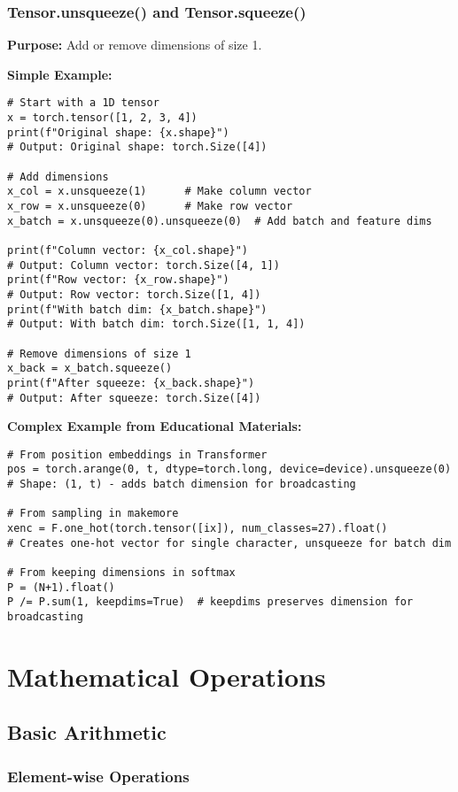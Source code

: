 \documentclass[11pt,a4paper]{book}
\begin{document}
\subsection{Tensor.unsqueeze() and Tensor.squeeze()}

\textbf{Purpose:} Add or remove dimensions of size 1.

\textbf{Simple Example:}
\begin{verbatim}
# Start with a 1D tensor
x = torch.tensor([1, 2, 3, 4])
print(f"Original shape: {x.shape}")
# Output: Original shape: torch.Size([4])

# Add dimensions
x_col = x.unsqueeze(1)      # Make column vector
x_row = x.unsqueeze(0)      # Make row vector
x_batch = x.unsqueeze(0).unsqueeze(0)  # Add batch and feature dims

print(f"Column vector: {x_col.shape}")
# Output: Column vector: torch.Size([4, 1])
print(f"Row vector: {x_row.shape}")
# Output: Row vector: torch.Size([1, 4])
print(f"With batch dim: {x_batch.shape}")
# Output: With batch dim: torch.Size([1, 1, 4])

# Remove dimensions of size 1
x_back = x_batch.squeeze()
print(f"After squeeze: {x_back.shape}")
# Output: After squeeze: torch.Size([4])
\end{verbatim}

\textbf{Complex Example from Educational Materials:}
\begin{verbatim}
# From position embeddings in Transformer
pos = torch.arange(0, t, dtype=torch.long, device=device).unsqueeze(0)
# Shape: (1, t) - adds batch dimension for broadcasting

# From sampling in makemore
xenc = F.one_hot(torch.tensor([ix]), num_classes=27).float()
# Creates one-hot vector for single character, unsqueeze for batch dim

# From keeping dimensions in softmax
P = (N+1).float()
P /= P.sum(1, keepdims=True)  # keepdims preserves dimension for broadcasting
\end{verbatim}

\chapter{Mathematical Operations}

\section{Basic Arithmetic}

\subsection{Element-wise Operations}
\end{document}
